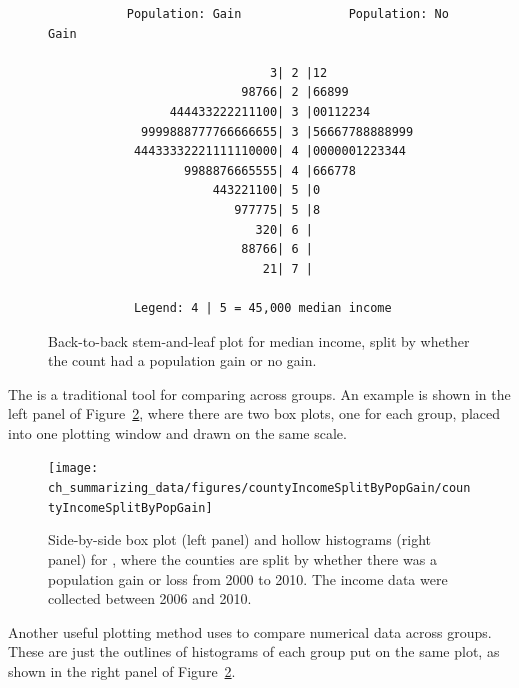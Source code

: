 \begin{figure}
\begin{verbatim}
           Population: Gain               Population: No Gain

                               3| 2 |12
                           98766| 2 |66899
                 444433222211100| 3 |00112234
             9999888777766666655| 3 |56667788888999
            44433332221111110000| 4 |0000001223344
                   9988876665555| 4 |666778
                       443221100| 5 |0
                          977775| 5 |8
                             320| 6 |
                           88766| 6 |
                              21| 7 |

            Legend: 4 | 5 = 45,000 median income
\end{verbatim}
\caption{Back-to-back stem-and-leaf plot for median income, split by whether the count had a population gain or no gain.}
\label{stemandleafincomepopgainloss}
\end{figure}

The   is a traditional tool for comparing across groups. An example is shown in the left panel of Figure~\ref{countyIncomeSplitByPopGain}, where there are two box plots, one for each group, placed into one plotting window and drawn on the same scale.

\begin{figure}
   \centering
   \texttt{[image: ch\_summarizing\_data/figures/countyIncomeSplitByPopGain/countyIncomeSplitByPopGain]}
   \caption{Side-by-side box plot (left panel) and hollow histograms (right panel) for , where the counties are split by whether there was a population gain or loss from 2000 to 2010. The income data were collected between 2006 and 2010.}
   \label{countyIncomeSplitByPopGain}
\end{figure}

Another useful plotting method uses  to compare numerical data across groups. These are just the outlines of histograms of each group put on the same plot, as shown in the right panel of Figure~\ref{countyIncomeSplitByPopGain}.

